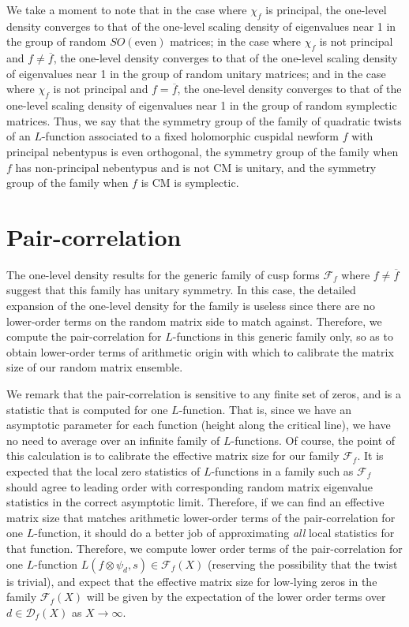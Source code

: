 \documentclass[11pt,reqno]{amsart} \usepackage{fullpage}
\newcommand{\F}{\ensuremath{\mathbf{F}}}
\newcommand{\ra}{\rightarrow}
\newcommand{\D}{\mathcal D_f}
\renewcommand{\F}{\mathcal F_f}
\numberwithin{equation}{section}
\begin{document}
We take a moment to note that in the case where $\chi_f$ is principal, the
one-level density converges to that of the one-level scaling density of
eigenvalues near 1 in the group of random $SO(\text{even})$
matrices; in the case where $\chi_f$ is not principal and
$f\ne \overline f$, the one-level
density converges to that of the one-level scaling density of eigenvalues
near 1 in the group of random unitary matrices; and in the case where $\chi_f$ is
not principal and $f=\overline f$, the one-level density converges to that of
the one-level scaling density of eigenvalues near 1 in the group of random
symplectic matrices. Thus, we say that the
symmetry group of the family of quadratic twists of an $L$-function associated
to a fixed holomorphic cuspidal newform $f$ with principal nebentypus is even
orthogonal, the symmetry group of the family when $f$ has non-principal
nebentypus and is not CM is unitary, and the symmetry group of the
family when $f$ is CM is symplectic.

\section{Pair-correlation}
The one-level density results for the generic family of cusp forms $\F$ where
$f\ne\overline f$ suggest that this family has unitary symmetry. In this case, the detailed
expansion of the one-level density for the family is useless since there are no lower-order
terms on the random matrix side to match against. Therefore, we compute the
pair-correlation for $L$-functions in this generic family only, so as to obtain lower-order
terms of arithmetic origin with which to calibrate the matrix size of our random matrix
ensemble.

We remark that the pair-correlation is sensitive to any finite set of zeros, and is a
statistic that is computed for one $L$-function. That is, since we have an asymptotic
parameter for each function (height along the critical line), we have no need to average
over an infinite family of $L$-functions. Of course, the point of this calculation is to
calibrate the effective matrix size for our family $\F$. It is expected that the local zero
statistics of $L$-functions in a family such as $\F$ should agree to leading order with
corresponding random matrix eigenvalue statistics in the correct asymptotic limit.
Therefore, if we can find an effective matrix size that matches arithmetic lower-order
terms of the pair-correlation for one $L$-function, it should do a better job of
approximating \emph{all} local statistics for that function. Therefore, we compute lower
order terms of the pair-correlation for one $L$-function $L(f\otimes\psi_d,s)\in\F(X)$
(reserving the possibility that the twist is trivial), and expect that the effective matrix
size for low-lying zeros in the family $\F(X)$ will be given by the expectation of the
lower order terms over $d\in\D(X)$ as $X\ra\infty$.
\end{document}
